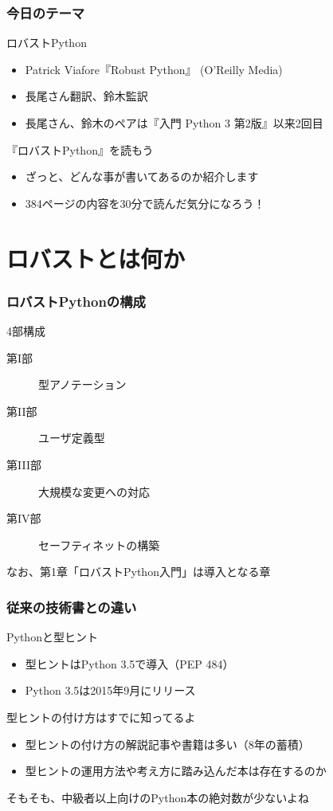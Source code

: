 \documentclass[aspectratio=169,dvipdfmx,14pt,notheorems]{beamer}
\theoremstyle{definition}
\begin{document}
\begin{frame}\frametitle{今日のテーマ}

\begin{block}{ロバストPython}
\begin{itemize}
\item Patrick Viafore『Robust Python』 (O'Reilly Media)
\item 長尾さん翻訳、鈴木監訳
\item 長尾さん、鈴木のペアは『入門 Python 3 第2版』以来2回目
\end{itemize}
\end{block}

\begin{exampleblock}{『ロバストPython』を読もう}
\begin{itemize}
\item ざっと、どんな事が書いてあるのか紹介します
\item 384ページの内容を30分で読んだ気分になろう！
\end{itemize}
\end{exampleblock}
\end{frame}

\section{ロバストとは何か}

\begin{frame}\frametitle{ロバストPythonの構成}
\begin{block}{4部構成}
\begin{description}
\item[第I部] 型アノテーション
\item[第II部] ユーザ定義型
\item[第III部] 大規模な変更への対応
\item[第IV部] セーフティネットの構築
\end{description}
\end{block}
なお、第1章「ロバストPython入門」は導入となる章
\end{frame}

\begin{frame}\frametitle{従来の技術書との違い}

\begin{exampleblock}{Pythonと型ヒント}
\begin{itemize}
\item 型ヒントはPython 3.5で導入（PEP 484）
\item Python 3.5は2015年9月にリリース
\end{itemize}
\end{exampleblock}

\begin{alertblock}{型ヒントの付け方はすでに知ってるよ}
\begin{itemize}
\item 型ヒントの付け方の解説記事や書籍は多い（8年の蓄積）
\item 型ヒントの運用方法や考え方に踏み込んだ本は存在するのか
\end{itemize}
\end{alertblock}
そもそも、中級者以上向けのPython本の絶対数が少ないよね
\end{frame}
\end{document}
